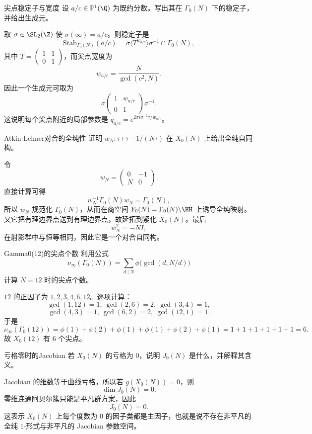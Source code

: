\begin{problem}{尖点稳定子与宽度}
设 $a/c\in\mathbb{P}^1(\Q)$ 为既约分数。写出其在 $\Gamma_0(N)$ 下的稳定子，并给出生成元。
\end{problem}
\begin{solution}
取 $\sigma\in\SL_2(\Z)$ 使 $\sigma(\infty)=a/c$。则稳定子是
\[
\mathrm{Stab}_{\Gamma_0(N)}(a/c)=\sigma\langle T^{w_{a/c}}\rangle\sigma^{-1}\cap\Gamma_0(N),
\]
其中 $T=\begin{pmatrix}1&1\\0&1\end{pmatrix}$，而尖点宽度为
\[
w_{a/c}=\frac{N}{\gcd(c^2,N)}.
\]
因此一个生成元可取为
\[
\sigma\begin{pmatrix}1&w_{a/c}\\0&1\end{pmatrix}\sigma^{-1}.
\]
这说明每个尖点附近的局部参数是 $q_{a/c}=e^{2\pi i\sigma^{-1}\tau/w_{a/c}}$。
\end{solution}

\begin{problem}{Atkin-Lehner对合的全纯性}
证明 $w_N:\tau\mapsto -1/(N\tau)$ 在 $X_0(N)$ 上给出全纯自同构。
\end{problem}
\begin{solution}
令
\[
w_N=\begin{pmatrix}0&-1\\N&0\end{pmatrix}.
\]
直接计算可得
\[
w_N^{-1}\Gamma_0(N)w_N=\Gamma_0(N),
\]
所以 $w_N$ 规范化 $\Gamma_0(N)$，从而在商空间 $Y_0(N)=\Gamma_0(N)\backslash\HH$ 上诱导全纯映射。又它把有理边界点送到有理边界点，故延拓到紧化 $X_0(N)$。最后
\[
w_N^2=-NI,
\]
在射影群中与恒等相同，因此它是一个对合自同构。
\end{solution}

\begin{problem}{Gamma0(12)的尖点个数}
利用公式
\[
\nu_\infty(\Gamma_0(N))=\sum_{d\mid N}\phi\bigl(\gcd(d,N/d)\bigr)
\]
计算 $N=12$ 时的尖点个数。
\end{problem}
\begin{solution}
$12$ 的正因子为 $1,2,3,4,6,12$。逐项计算：
\[
\gcd(1,12)=1,\ \gcd(2,6)=2,\ \gcd(3,4)=1,
\]
\[
\gcd(4,3)=1,\ \gcd(6,2)=2,\ \gcd(12,1)=1.
\]
于是
\[
\nu_\infty(\Gamma_0(12))=
\phi(1)+\phi(2)+\phi(1)+\phi(1)+\phi(2)+\phi(1)=1+1+1+1+1+1=6.
\]
故 $X_0(12)$ 有 $6$ 个尖点。
\end{solution}

\begin{problem}{亏格零时的Jacobian}
若 $X_0(N)$ 的亏格为 $0$，说明 $J_0(N)$ 是什么，并解释其含义。
\end{problem}
\begin{solution}
Jacobian 的维数等于曲线亏格，所以若 $g(X_0(N))=0$，则
\[
\dim J_0(N)=0.
\]
零维连通阿贝尔簇只能是平凡群方案，因此
\[
J_0(N)=0.
\]
这表示 $X_0(N)$ 上每个度数为 $0$ 的因子类都是主因子，也就是说不存在非平凡的全纯 $1$-形式与非平凡的 Jacobian 参数空间。
\end{solution}

